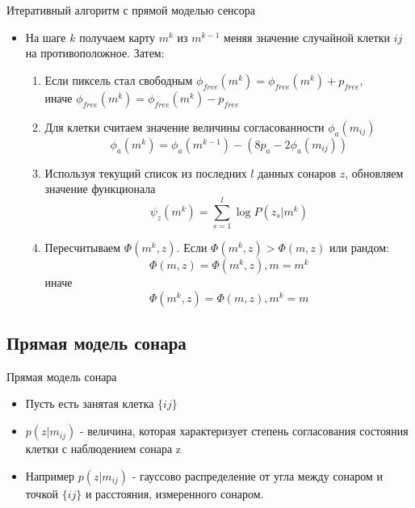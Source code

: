 \documentclass[9pt]{beamer}
\begin{document}
\begin{frame}{Итеративный алгоритм с прямой моделью сенсора}
\begin{itemize}
  \item
  {
    На шаге $k$ получаем карту $m^{k}$ из $m^{k-1}$ меняя значение случайной клетки ${ij}$ на противоположное. Затем:
    \begin{enumerate}
      \item
      {
        Если пиксель стал свободным $\phi_{free}(m^{k}) = \phi_{free}(m^{k}) + p_{free}$,\\ иначе $\phi_{free}(m^{k}) = \phi_{free}(m^{k}) - p_{free}$
      }
      \item
      {
        Для клетки считаем значение величины согласованности $\phi_a(m_{ij})$
        $$\phi_a(m^k) = \phi_a(m^{k-1}) - (8p_a - 2\phi_a(m_{ij}))$$
      }
      \item
      {
        Используя текущий список из последних $l$ данных сонаров $z$,  обновляем значение функционала $$\psi_{z}(m^{k}) = \sum_{s=1}^l \log{P(z_s|m^k)}$$
      }
      \item
      {
        Пересчитываем $\Phi(m^{k}, z)$. 
        Если $\Phi(m^{k}, z) > \Phi(m, z)$ или рандом:
        $$\Phi(m, z) = \Phi(m^{k}, z), m = m^k$$
        иначе
        $$\Phi(m^{k}, z) = \Phi(m, z), m^k = m $$
      }
    \end{enumerate}
  }
  \end{itemize}
\end{frame}


\subsection{Прямая модель сонара}

\begin{frame}{Прямая модель сонара}
\begin{itemize}
  \item
  {
    Пусть есть занятая клетка $\{ij\}$
  }
  \item
  {
    $p(z|m_{ij})$ - величина, которая характеризует степень согласования состояния клетки с наблюдением сонара z 
  }
  \item
  {
    Например $p(z|m_{ij})$ - гауссово распределение от угла между сонаром и точкой $\{ij\}$ и расстояния, измеренного сонаром.
  }
\end{itemize}
\end{frame}
\end{document}
